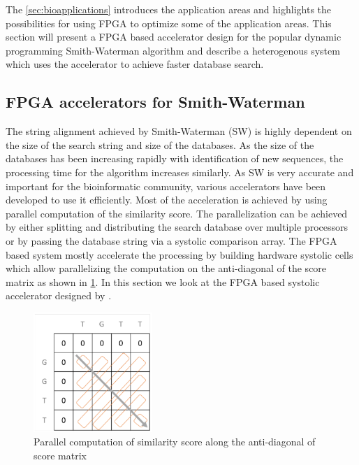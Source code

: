 \documentclass[12pt,twoside]{article}
\begin{document}
The \cref{sec:bioapplications} introduces the application areas and highlights the possibilities for using FPGA to optimize some of the application
areas. This section will present a FPGA based accelerator design for the popular dynamic programming Smith-Waterman algorithm and 
describe a heterogenous system which uses the accelerator to achieve faster database search.

\subsection{FPGA accelerators for Smith-Waterman}
\label{subsec:fpgaaccelerator}

The string alignment achieved by Smith-Waterman (SW) is highly dependent on the size of the search string and size of the databases.
As the size of the databases has been increasing rapidly with identification of new sequences, the processing time for the algorithm
increases similarly. As SW is very accurate and important for the bioinformatic community, various accelerators have been developed
to use it efficiently. Most of the acceleration is achieved by using parallel computation of the similarity score. The
parallelization can be achieved by either splitting and distributing the search database over multiple processors \cite{martins_multithreaded_2000, boukerche_parallel_2005, schmidt_massively_2002, rucci_smith-waterman_2014}
or by passing the database string via a systolic comparison array. The FPGA based system mostly accelerate the processing by 
building hardware systolic cells which allow parallelizing the computation on the anti-diagonal of the score matrix
as shown in \cref{fig:antidiagonal}. In this section we look at the FPGA based systolic accelerator designed by \textcite{oliver_hyper_2005}.

\begin{figure}[h]%
    \centering
    \includegraphics[width=0.4\textwidth]{fig/computation}
    \caption{Parallel computation of similarity score along the anti-diagonal of score matrix}
    \label{fig:antidiagonal}
\end{figure}
\end{document}
